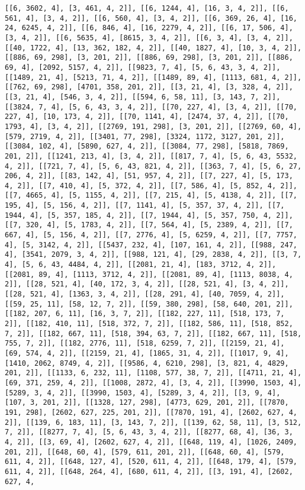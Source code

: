 \documentclass[12pt,fleqn]{article}\usepackage{../../common}
\begin{document}
\begin{verbatim}
[[6, 3602, 4], [3, 461, 4, 2]], [[6, 1244, 4], [16, 3, 4, 2]], [[6, 561, 4], [3, 4, 2]], [[6, 560, 4], [3, 4, 2]], [[6, 369, 26, 4], [16, 24, 6245, 4, 2]], [[6, 846, 4], [16, 2279, 4, 2]], [[6, 17, 506, 4], [3, 4, 2]], [[6, 5635, 4], [8615, 3, 4, 2]], [[6, 3, 4], [3, 4, 2]], [[40, 1722, 4], [13, 362, 182, 4, 2]], [[40, 1827, 4], [10, 3, 4, 2]], [[886, 69, 298], [3, 201, 2]], [[886, 69, 298], [3, 201, 2]], [[886, 69, 4], [2092, 5157, 4, 2]], [[9823, 7, 4], [5, 6, 43, 3, 4, 2]], [[1489, 21, 4], [5213, 71, 4, 2]], [[1489, 89, 4], [1113, 681, 4, 2]], [[762, 69, 298], [4701, 358, 201, 2]], [[3, 21, 4], [3, 328, 4, 2]], [[3, 21, 4], [546, 3, 4, 2]], [[594, 6, 58, 11], [3, 143, 7, 2]], [[3824, 7, 4], [5, 6, 43, 3, 4, 2]], [[70, 227, 4], [3, 4, 2]], [[70, 227, 4], [10, 173, 4, 2]], [[70, 1141, 4], [2474, 37, 4, 2]], [[70, 1793, 4], [3, 4, 2]], [[2769, 191, 298], [3, 201, 2]], [[2769, 60, 4], [579, 2719, 4, 2]], [[3401, 77, 298], [3324, 1172, 3127, 201, 2]], [[3084, 102, 4], [5890, 627, 4, 2]], [[3084, 77, 298], [5818, 7869, 201, 2]], [[1241, 213, 4], [3, 4, 2]], [[817, 7, 4], [5, 6, 43, 5532, 4, 2]], [[721, 7, 4], [5, 6, 43, 821, 4, 2]], [[363, 7, 4], [5, 6, 27, 206, 4, 2]], [[83, 142, 4], [51, 957, 4, 2]], [[7, 227, 4], [5, 173, 4, 2]], [[7, 410, 4], [5, 372, 4, 2]], [[7, 586, 4], [5, 852, 4, 2]], [[7, 4665, 4], [5, 1155, 4, 2]], [[7, 215, 4], [5, 4138, 4, 2]], [[7, 195, 4], [5, 156, 4, 2]], [[7, 1141, 4], [5, 357, 37, 4, 2]], [[7, 1944, 4], [5, 357, 185, 4, 2]], [[7, 1944, 4], [5, 357, 750, 4, 2]], [[7, 320, 4], [5, 1783, 4, 2]], [[7, 564, 4], [5, 2389, 4, 2]], [[7, 667, 4], [5, 156, 4, 2]], [[7, 2776, 4], [5, 6259, 4, 2]], [[7, 7757, 4], [5, 3142, 4, 2]], [[5437, 232, 4], [107, 161, 4, 2]], [[988, 247, 4], [3541, 2079, 3, 4, 2]], [[988, 121, 4], [29, 2838, 4, 2]], [[3, 7, 4], [5, 6, 43, 4484, 4, 2]], [[2081, 21, 4], [183, 3712, 4, 2]], [[2081, 89, 4], [1113, 3712, 4, 2]], [[2081, 89, 4], [1113, 8038, 4, 2]], [[28, 521, 4], [40, 172, 3, 4, 2]], [[28, 521, 4], [3, 4, 2]], [[28, 521, 4], [1363, 3, 4, 2]], [[28, 291, 4], [40, 7059, 4, 2]], [[59, 25, 11], [58, 12, 7, 2]], [[59, 380, 298], [58, 640, 201, 2]], [[182, 207, 6, 11], [16, 3, 7, 2]], [[182, 227, 11], [518, 173, 7, 2]], [[182, 410, 11], [518, 372, 7, 2]], [[182, 586, 11], [518, 852, 7, 2]], [[182, 667, 11], [518, 394, 63, 7, 2]], [[182, 667, 11], [518, 755, 7, 2]], [[182, 2776, 11], [518, 6259, 7, 2]], [[2159, 21, 4], [69, 574, 4, 2]], [[2159, 21, 4], [1865, 31, 4, 2]], [[1017, 9, 4], [1410, 2062, 8749, 4, 2]], [[9586, 4, 6210, 298], [3, 821, 4, 4829, 201, 2]], [[1133, 6, 232, 11], [1108, 577, 38, 7, 2]], [[4711, 21, 4], [69, 371, 259, 4, 2]], [[1008, 2872, 4], [3, 4, 2]], [[3990, 1503, 4], [5289, 3, 4, 2]], [[3990, 1503, 4], [5289, 3, 4, 2]], [[3, 9, 4], [107, 3, 201, 2]], [[1328, 127, 298], [4773, 629, 201, 2]], [[7870, 191, 298], [2602, 627, 225, 201, 2]], [[7870, 191, 4], [2602, 627, 4, 2]], [[139, 6, 183, 11], [3, 143, 7, 2]], [[139, 62, 58, 11], [3, 512, 7, 2]], [[8277, 7, 4], [5, 6, 43, 3, 4, 2]], [[8277, 68, 4], [36, 3, 4, 2]], [[3, 69, 4], [2602, 627, 4, 2]], [[648, 119, 4], [1026, 2409, 201, 2]], [[648, 60, 4], [579, 611, 201, 2]], [[648, 60, 4], [579, 611, 4, 2]], [[648, 127, 4], [520, 611, 4, 2]], [[648, 179, 4], [579, 611, 4, 2]], [[648, 264, 4], [680, 611, 4, 2]], [[3, 191, 4], [2602, 627, 4, 
\end{verbatim}
\end{document}
